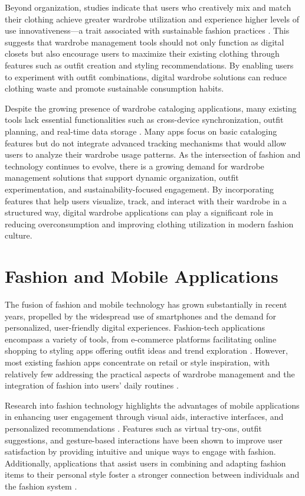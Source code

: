 Beyond organization, studies indicate that users who creatively mix and match their clothing achieve greater wardrobe utilization and experience higher levels of use innovativeness—a trait associated with sustainable fashion practices \cite{choo14}. This suggests that wardrobe management tools should not only function as digital closets but also encourage users to maximize their existing clothing through features such as outfit creation and styling recommendations. By enabling users to experiment with outfit combinations, digital wardrobe solutions can reduce clothing waste and promote sustainable consumption habits.

Despite the growing presence of wardrobe cataloging applications, many existing tools lack essential functionalities such as cross-device synchronization, outfit planning, and real-time data storage \cite{nie2013between}. Many apps focus on basic cataloging features but do not integrate advanced tracking mechanisms that would allow users to analyze their wardrobe usage patterns. As the intersection of fashion and technology continues to evolve, there is a growing demand for wardrobe management solutions that support dynamic organization, outfit experimentation, and sustainability-focused engagement. By incorporating features that help users visualize, track, and interact with their wardrobe in a structured way, digital wardrobe applications can play a significant role in reducing overconsumption and improving clothing utilization in modern fashion culture.

\section{Fashion and Mobile Applications}
The fusion of fashion and mobile technology has grown substantially in recent years, propelled by the widespread use of smartphones and the demand for personalized, user-friendly digital experiences. Fashion-tech applications encompass a variety of tools, from e-commerce platforms facilitating online shopping to styling apps offering outfit ideas and trend exploration \cite{nie2013between}. However, most existing fashion apps concentrate on retail or style inspiration, with relatively few addressing the practical aspects of wardrobe management and the integration of fashion into users' daily routines \cite{fits2024}.

Research into fashion technology highlights the advantages of mobile applications in enhancing user engagement through visual aids, interactive interfaces, and personalized recommendations \cite{nie2013between}. Features such as virtual try-ons, outfit suggestions, and gesture-based interactions have been shown to improve user satisfaction by providing intuitive and unique ways to engage with fashion. Additionally, applications that assist users in combining and adapting fashion items to their personal style foster a stronger connection between individuals and the fashion system \cite{nie2013between}.

